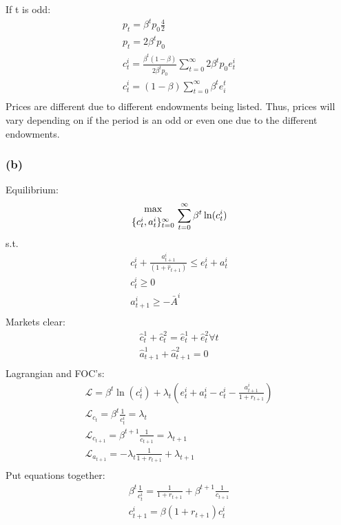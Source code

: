 \documentclass[10pt, a4paper]{article}
\begin{document}
      If t is odd: 
      \begin{gather*}
        p_t = \beta^tp_0\frac{4}{2} \\
        \boxed{p_t = 2\beta^tp_0} \\
        c_t^i = \frac{\beta^t(1-\beta)}{2\beta^tp_0}\sum\limits_{t=0}^{\infty}2\beta^tp_0e_t^i \\
        c_t^i = (1-\beta)\sum\limits_{t=0}^{\infty}\beta^te_i^t \\
      \end{gather*}
      Prices are different due to different endowments being listed. Thus, prices will vary depending on if the period is an odd or even one due to the different endowments.
    \subsubsection*{(b)}
      Equilibrium:
      \begin{gather*}
        {\max\atop{\{c_t^i, a_t^i\}^{\infty}_{t=0}}} \sum\limits_{t=0}^{\infty} \beta^t\ln(c_t^i) \\
      \end{gather*}
      s.t.
      \begin{gather*}
        c_t^i  +\frac{a_{t+1}^i}{(1+\hat{r}_{t+1})} \leq e_t^i+a_t^i \\
        c_t^i \geq 0 \\
        a_{t+1}^i \geq -\bar{A}^i \\
      \end{gather*}
      Markets clear:
      \begin{gather*}
        \hat{c}_t^1 + \hat{c}_t^2 = \hat{e}_t^1 + \hat{e}_t^2 \forall t \\
        \hat{a}_{t+1}^1 + \hat{a}_{t+1}^2 = 0 \\
      \end{gather*}
      Lagrangian and FOC's: 
      \begin{gather*}
        \mathcal{L} = \beta^t\ln(c_t^i) + \lambda_t(e_t^i+a_t^i-c_t^i-\frac{a_{t+1}^i}{1+r_{t+1}}) \\
        \mathcal{L}_{c_t} = \beta^t\frac{1}{c_t^i} = \lambda_t \\
        \mathcal{L}_{c_{t+1}} = \beta^{t+1}\frac{1}{c_{t+1}} = \lambda_{t+1} \\
        \mathcal{L}_{a_{t+1}} = -\lambda_t\frac{1}{1+r_{t+1}} + \lambda_{t+1} \\
      \end{gather*}
      Put equations together:
      \begin{gather*}
        \beta^t\frac{1}{c_t^i} = \frac{1}{1+r_{t+1}}+\beta^{t+1}\frac{1}{c_{t+1}} \\
        \boxed{c_{t+1}^i = \beta(1+r_{t+1})c_t^i} \\
      \end{gather*}
\end{document}
